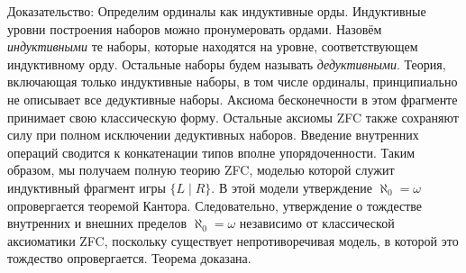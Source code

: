 \documentclass[12pt]{article}
\begin{document}
Доказательство:
Определим ординалы как индуктивные орды. Индуктивные уровни построения наборов можно пронумеровать ордами. Назовём {\it индуктивными} те наборы, которые находятся на уровне, соответствующем индуктивному орду. Остальные наборы будем называть {\it дедуктивными}. Теория, включающая только индуктивные наборы, в том числе ординалы, принципиально не описывает все дедуктивные наборы. Аксиома бесконечности в этом фрагменте принимает свою классическую форму. Остальные аксиомы ZFC также сохраняют силу при полном исключении дедуктивных наборов. Введение внутренних операций сводится к конкатенации типов вполне упорядоченности. Таким образом, мы получаем полную теорию ZFC, моделью которой служит индуктивный фрагмент игры $\{ L \mid R \}$. В этой модели утверждение $\aleph_0 = \omega$ опровергается теоремой Кантора. Следовательно, утверждение о тождестве внутренних и внешних пределов $\aleph_0 = \omega$ независимо от классической аксиоматики ZFC, поскольку существует непротиворечивая модель, в которой это тождество опровергается. Теорема доказана.
\end{document}
